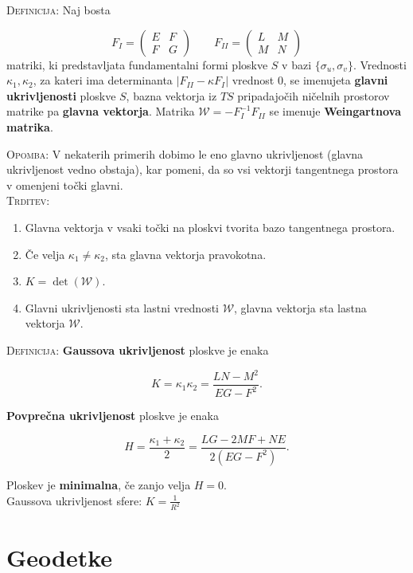 \documentclass[8pt,a4paper]{amsart}
\theoremstyle{definition} %
\theoremstyle{plain} %
\begin{document}
\textsc{Definicija: }Naj bosta 

$$
F_I=\left( \begin{array}{cc} E & F \\ F & G \end{array} \right)
\qquad
F_{II}=\left( \begin{array}{cc} L & M \\ M & N \end{array} \right)
$$
matriki, ki predstavljata fundamentalni formi ploskve $S$ v bazi $\{ \sigma_u,\sigma_v\}$. Vrednosti $\kappa_1,\kappa_2$, za kateri ima determinanta $|F_{II}-\kappa F_I|$ vrednost $0$, se imenujeta \textbf{glavni ukrivljenosti} ploskve $S$, bazna vektorja iz $TS$ pripadajočih ničelnih prostorov matrike pa \textbf{glavna vektorja}. Matrika $\mathcal{W}=-F_I^{-1}F_{II}$ se imenuje \textbf{Weingartnova matrika}.

\textsc{Opomba:} V nekaterih primerih dobimo le eno glavno ukrivljenost (glavna ukrivljenost vedno obstaja), kar pomeni, da so vsi vektorji tangentnega prostora v omenjeni točki glavni.
\\

\textsc{Trditev:}
\begin{enumerate}
\item Glavna vektorja v vsaki točki na ploskvi tvorita bazo tangentnega prostora.
\item Če velja $\kappa_1 \neq \kappa_2$, sta glavna vektorja pravokotna.
\item $K = \det(\mathcal{W})$.
\item Glavni ukrivljenosti sta lastni vrednosti $\mathcal{W}$, glavna vektorja sta lastna vektorja $\mathcal{W}$.
\end{enumerate}

\textsc{Definicija:} \textbf{Gaussova ukrivljenost} ploskve je enaka

$$
K = \kappa_1\kappa_2 = \frac{LN-M^2}{EG-F^2}.
$$

\textbf{Povprečna ukrivljenost} ploskve je enaka

$$
H = \frac{\kappa_1+\kappa_2}{2} = \frac{LG-2MF+NE}{2(EG-F^2)}.
$$

Ploskev je \textbf{minimalna}, če zanjo velja $H=0$.
\\

Gaussova ukrivljenost sfere: $K = \frac{1}{R^2}$

\section*{\textbf{Geodetke}} %
\end{document}

